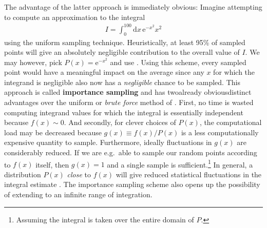 \documentclass[../../master.tex]{subfiles}
\begin{document}
The advantage of the latter approach is immediately obvious: Imagine attempting to compute an approximation to the integral
\begin{align}
I=\int_0^{100}\mathrm{d}x\, \mathrm{e}^{-x^2}x^2
\end{align}
using the uniform sampling technique. Heuristically, at least 95\% of sampled points will give an absolutely negligible contribution to the overall value of $I$. We may however, pick $P(x)=\mathrm{e}^{-x^2}$ and use . Using this scheme, every sampled point would have a meaningful impact on the average since any $x$ for which the integrand is negligible also now has a \emph{negligible} chance to be sampled. This approach is called {\bf importance sampling} and has two\textemdash already obvious\textemdash distinct advantages over the uniform or \emph{brute force} method of . First, no time is wasted computing integrand values for which the integral is essentially independent because $f(x)\sim0$. And secondly, for clever choices of $P(x)$, the computational load may be decreased because $g(x)\equiv f(x)/P(x)$ is a less computationally expensive quantity to sample. Furthermore, ideally fluctuations in $g(x)$ are considerably reduced. If we are e.g.\ able to sample our random points according to $f(x)$ itself, then $g(x)=1$ and a single sample is sufficient.\footnote{Assuming the integral is taken over the entire domain of $P$.} In general, a distribution $P(x)$ \emph{close} to $f(x)$ will give reduced statistical fluctuations in the integral estimate \cite{hammond}. The importance sampling scheme also opens up the possibility of extending to an infinite range of integration.
\end{document}
